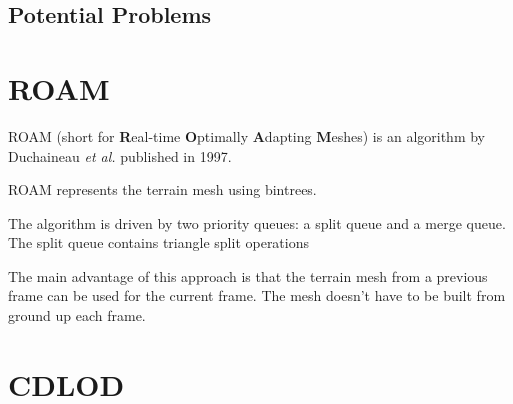 \subsection{Potential Problems}

\section{ROAM}
ROAM (short for \textbf{R}eal-time \textbf{O}ptimally \textbf{A}dapting \textbf{M}eshes) is an algorithm by Duchaineau \textit{et al.} \cite{roam} published in 1997.

ROAM represents the terrain mesh using bintrees. 

The algorithm is driven by two priority queues: a split queue and a merge queue.
The split queue contains triangle split operations 

The main advantage of this approach is that the terrain mesh from a previous 
frame can be used for the current frame. The mesh doesn't have 
to be built from ground up each frame.


\section{CDLOD}


